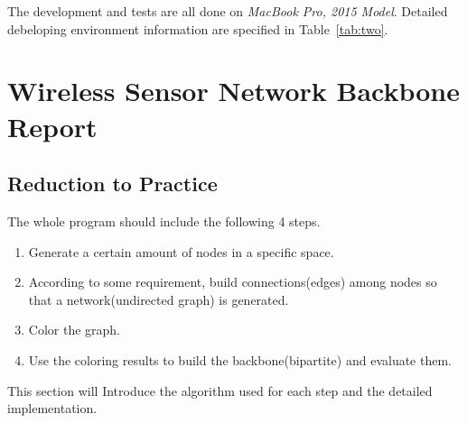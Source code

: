 \documentclass[prodmode,acmtecs]{acmsmall} %
\begin{document}
The development and tests are all done on \emph{MacBook Pro, 2015 Model}. Detailed debeloping environment information are specified in Table~\ref{tab:two}.

\begin{table}
\end{table}

\section{Wireless Sensor Network Backbone Report}
\subsection{Reduction to Practice}
The whole program should include the following 4 steps.
\begin{enumerate}
    \item Generate a certain amount of nodes in a specific space.
    \item According to some requirement, build connections(edges) among nodes so that a network(undirected graph) is generated.
    \item Color the graph.
    \item Use the coloring results to build the backbone(bipartite) and evaluate them.
\end{enumerate}
This section will Introduce the algorithm used for each step and the detailed implementation.
\end{document}
